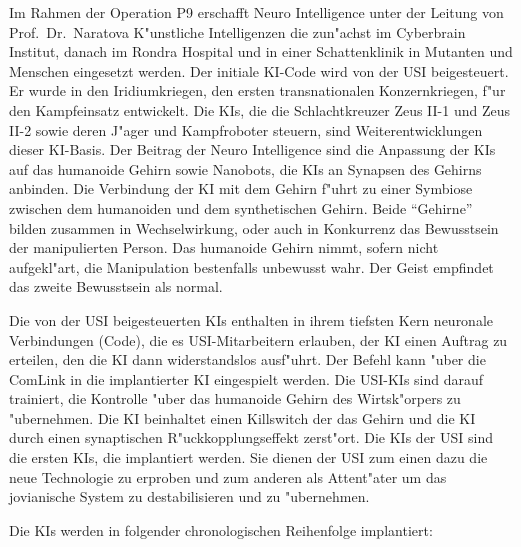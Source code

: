 
Im Rahmen der Operation P9 erschafft Neuro Intelligence unter der Leitung von Prof.~Dr.~Naratova K"unstliche Intelligenzen die zun"achst im Cyberbrain Institut, danach im Rondra Hospital und in einer Schattenklinik in Mutanten und Menschen eingesetzt werden. Der initiale KI-Code wird von der USI beigesteuert. Er wurde in den Iridiumkriegen, den ersten transnationalen Konzernkriegen, f"ur den Kampfeinsatz entwickelt. Die KIs, die die Schlachtkreuzer Zeus II-1 und Zeus II-2 sowie deren J"ager und Kampfroboter steuern, sind Weiterentwicklungen dieser KI-Basis. Der Beitrag der Neuro Intelligence sind die Anpassung der KIs auf das humanoide Gehirn sowie Nanobots, die KIs an Synapsen des Gehirns anbinden. Die Verbindung der KI mit dem Gehirn f"uhrt zu einer Symbiose zwischen dem humanoiden und dem synthetischen Gehirn. Beide "`Gehirne"' bilden zusammen in Wechselwirkung, oder auch in Konkurrenz das Bewusstsein der manipulierten Person. Das humanoide Gehirn nimmt, sofern nicht aufgekl"art, die Manipulation bestenfalls unbewusst wahr. Der Geist empfindet das zweite Bewusstsein als normal.

Die von der USI beigesteuerten KIs enthalten in ihrem tiefsten Kern neuronale Verbindungen (Code), die es USI-Mitarbeitern erlauben, der KI einen Auftrag zu erteilen, den die KI dann widerstandslos ausf"uhrt. Der Befehl kann "uber die ComLink in die implantierter KI eingespielt werden. Die USI-KIs sind darauf trainiert, die Kontrolle "uber das humanoide Gehirn des Wirtsk"orpers zu "ubernehmen. Die KI beinhaltet einen Killswitch der das Gehirn und die KI durch einen synaptischen R"uckkopplungseffekt zerst"ort. Die KIs der USI sind die ersten KIs, die implantiert werden. Sie dienen der USI zum einen dazu die neue Technologie zu erproben und zum anderen als Attent"ater um das jovianische System zu destabilisieren und zu "ubernehmen. 

Die KIs werden in folgender chronologischen Reihenfolge implantiert:

